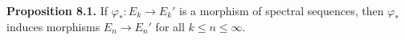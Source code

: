 \textbf{Proposition 8.1.} If $\varphi_* : E_k \to E_k'$ is a morphism of spectral sequences, then $\varphi_*$ induces morphisms $E_n \to E_n'$ for all $k \leq n \leq \infty$.
